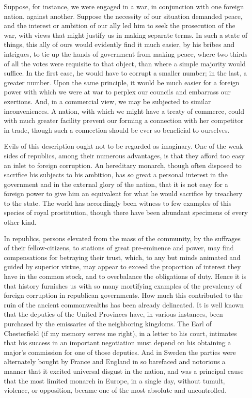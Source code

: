 Suppose, for instance, we were engaged in a war, in conjunction with one foreign nation, against another. 
Suppose the necessity of our situation demanded peace, and the interest or ambition of our ally led him to seek the prosecution of the war, with views that might justify us in making separate terms. 
In such a state of things, this ally of ours would evidently find it much easier, by his bribes and intrigues, to tie up the hands of government from making peace, where two thirds of all the votes were requisite to that object, than where a simple majority would suffice. 
In the first case, he would have to corrupt a smaller number; in the last, a greater number. 
Upon the same principle, it would be much easier for a foreign power with which we were at war to perplex our councils and embarrass our exertions. 
And, in a commercial view, we may be subjected to similar inconveniences. 
A nation, with which we might have a treaty of commerce, could with much greater facility prevent our forming a connection with her competitor in trade, though such a connection should be ever so beneficial to ourselves.

Evils of this description ought not to be regarded as imaginary. 
One of the weak sides of republics, among their numerous advantages, is that they afford too easy an inlet to foreign corruption. 
An hereditary monarch, though often disposed to sacrifice his subjects to his ambition, has so great a personal interest in the government and in the external glory of the nation, that it is not easy for a foreign power to give him an equivalent for what he would sacrifice by treachery to the state. 
The world has accordingly been witness to few examples of this species of royal prostitution, though there have been abundant specimens of every other kind.

In republics, persons elevated from the mass of the community, by the suffrages of their fellow-citizens, to stations of great pre-eminence and power, may find compensations for betraying their trust, which, to any but minds animated and guided by superior virtue, may appear to exceed the proportion of interest they have in the common stock, and to overbalance the obligations of duty. 
Hence it is that history furnishes us with so many mortifying examples of the prevalency of foreign corruption in republican governments. 
How much this contributed to the ruin of the ancient commonwealths has been already delineated. 
It is well known that the deputies of the United Provinces have, in various instances, been purchased by the emissaries of the neighboring kingdoms. 
The Earl of Chesterfield (if my memory serves me right), in a letter to his court, intimates that his success in an important negotiation must depend on his obtaining a major's commission for one of those deputies. 
And in Sweden the parties were alternately bought by France and England in so barefaced and notorious a manner that it excited universal disgust in the nation, and was a principal cause that the most limited monarch in Europe, in a single day, without tumult, violence, or opposition, became one of the most absolute and uncontrolled.

